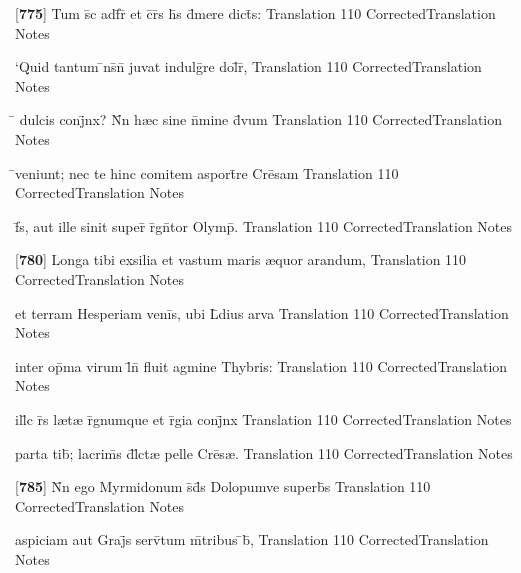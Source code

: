 \latline
  {[\textbf{775}] Tum s\={\macron {\i}}c adf\={}r\={\macron {\i}} et c\={}r\={}s h\={\macron {\i}}s d\={}mere dict\={\macron {\i}}s:}
  { Translation }
  {110}
  { CorrectedTranslation }
  { Notes }


\latline
  {`Quid tantum \={\macron {\i}}ns\={}n\={} juvat indulg\={}re dol\={}r\={\macron {\i}},}
  { Translation }
  {110}
  { CorrectedTranslation }
  { Notes }


\latline
  {\={} dulcis conj\={}nx? N\={}n h{\ae}c sine n\={}mine d\={\macron {\i}}vum}
  { Translation }
  {110}
  { CorrectedTranslation }
  { Notes }


\latline
  {\={}veniunt; nec te hinc comitem asport\={}re Cre\={}sam}
  { Translation }
  {110}
  { CorrectedTranslation }
  { Notes }


\latline
  {f\={}s, aut ille sinit super\={\macron {\i}} r\={}gn\={}tor Olymp\={\macron {\i}}.}
  { Translation }
  {110}
  { CorrectedTranslation }
  { Notes }


\latline
  {[\textbf{780}] Longa tibi exsilia et vastum maris {\ae}quor arandum,}
  { Translation }
  {110}
  { CorrectedTranslation }
  { Notes }


\latline
  {et terram Hesperiam veni\={}s, ubi L\={}dius arva}
  { Translation }
  {110}
  { CorrectedTranslation }
  { Notes }


\latline
  {inter op\={\macron {\i}}ma virum l\={}n\={\macron {\i}} fluit agmine Thybris:}
  { Translation }
  {110}
  { CorrectedTranslation }
  { Notes }


\latline
  {ill\={\macron {\i}}c r\={}s l{\ae}t{\ae} r\={}gnumque et r\={}gia conj\={}nx}
  { Translation }
  {110}
  { CorrectedTranslation }
  { Notes }


\latline
  {parta tib\={\macron {\i}}; lacrim\={}s d\={\macron {\i}}l\={}ct{\ae} pelle Cre\={}s{\ae}.}
  { Translation }
  {110}
  { CorrectedTranslation }
  { Notes }


\latline
  {[\textbf{785}] N\={}n ego Myrmidonum s\={}d\={}s Dolopumve superb\={}s}
  { Translation }
  {110}
  { CorrectedTranslation }
  { Notes }


\latline
  {aspiciam aut Graj\={\macron {\i}}s serv\={\macron {\i}}tum m\={}tribus \={\macron {\i}}b\={},}
  { Translation }
  {110}
  { CorrectedTranslation }
  { Notes }


